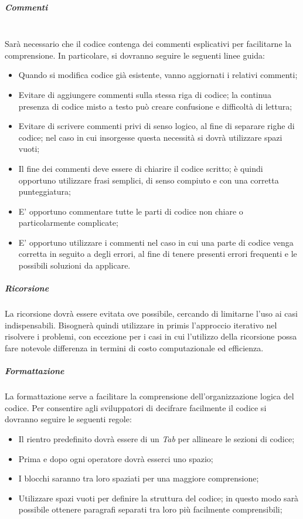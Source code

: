 	\subparagraph{Commenti}
	~\\Sarà necessario che il codice contenga dei commenti esplicativi per facilitarne la comprensione.
	\newline In particolare, si dovranno seguire le seguenti linee guida:
	
	\begin{itemize}
		\item Quando si modifica codice già esistente, vanno aggiornati i relativi commenti;
		\item Evitare di aggiungere commenti sulla stessa riga di codice; la continua presenza di codice misto a testo può creare confusione e difficoltà di lettura;
		\item Evitare di scrivere commenti privi di senso logico, al fine di separare righe di codice; nel caso in cui insorgesse questa necessità si dovrà utilizzare spazi vuoti;
		\item Il fine dei commenti deve essere di chiarire il codice scritto; è quindi opportuno utilizzare frasi semplici, di senso compiuto e con una corretta punteggiatura;
		\item E' opportuno commentare tutte le parti di codice non chiare o particolarmente complicate;
		\item E' opportuno utilizzare i commenti nel caso in cui una parte di codice venga corretta in seguito a degli errori, al fine di tenere presenti errori frequenti e le possibili soluzioni da applicare.
	\end{itemize}

	\subparagraph{Ricorsione}
	La ricorsione dovrà essere evitata ove possibile, cercando di limitarne l'uso ai casi indispensabili. Bisognerà quindi utilizzare in primis l'approccio iterativo nel risolvere i problemi, con eccezione per i casi in cui l'utilizzo della ricorsione possa fare notevole differenza in termini di costo computazionale ed efficienza. 
	
	
	\subparagraph{Formattazione}
	La formattazione serve a facilitare la comprensione dell'organizzazione logica del codice. Per consentire agli sviluppatori di decifrare facilmente il codice si dovranno seguire le seguenti regole:
	\begin{itemize} 
		\item Il rientro predefinito dovrà essere di un \emph{Tab} per allineare le sezioni di codice;
		\item Prima e dopo ogni operatore dovrà esserci uno spazio;
		\item I blocchi saranno tra loro spaziati per una maggiore comprensione;
		\item Utilizzare spazi vuoti per definire la struttura del codice; in questo modo sarà possibile ottenere paragrafi separati tra loro più facilmente comprensibili;
	\end{itemize}

